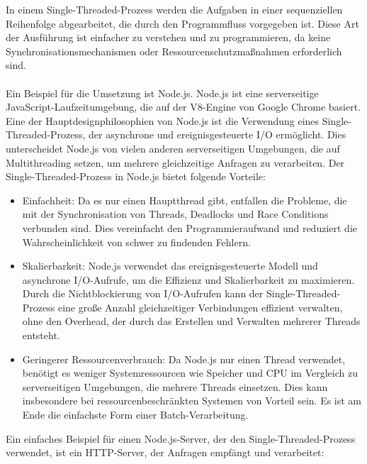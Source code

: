 \documentclass[../vs-script-first-v01.tex]{subfiles}
\begin{document}
In einem Single-Threaded-Prozess werden die Aufgaben in einer sequenziellen Reihenfolge abgearbeitet, die durch den Programmfluss vorgegeben ist. Diese Art der Ausführung ist einfacher zu verstehen und zu programmieren, da keine Synchronisationsmechanismen oder Ressourcenschutzmaßnahmen erforderlich sind.\\\\

Ein Beispiel für die Umsetzung ist Node.js. Node.js ist eine serverseitige JavaScript-Laufzeitumgebung, die auf der V8-Engine von Google Chrome basiert. Eine der Hauptdesignphilosophien von Node.js ist die Verwendung eines Single-Threaded-Prozess, der asynchrone und ereignisgesteuerte I/O ermöglicht. Dies unterscheidet Node.js von vielen anderen serverseitigen Umgebungen, die auf Multithreading setzen, um mehrere gleichzeitige Anfragen zu verarbeiten. Der Single-Threaded-Prozess in Node.js bietet folgende Vorteile:
\begin{itemize}
\item Einfachheit: Da es nur einen Hauptthread gibt, entfallen die Probleme, die mit der Synchronisation von Threads, Deadlocks und Race Conditions verbunden sind. Dies vereinfacht den Programmieraufwand und reduziert die Wahrscheinlichkeit von schwer zu findenden Fehlern.
\item Skalierbarkeit: Node.js verwendet das ereignisgesteuerte Modell und asynchrone I/O-Aufrufe, um die Effizienz und Skalierbarkeit zu maximieren. Durch die Nichtblockierung von I/O-Aufrufen kann der Single-Threaded-Prozess eine große Anzahl gleichzeitiger Verbindungen effizient verwalten, ohne den Overhead, der durch das Erstellen und Verwalten mehrerer Threads entsteht.
\item Geringerer Ressourcenverbrauch: Da Node.js nur einen Thread verwendet, benötigt es weniger Systemressourcen wie Speicher und CPU im Vergleich zu serverseitigen Umgebungen, die mehrere Threads einsetzen. Dies kann insbesondere bei ressourcenbeschränkten Systemen von Vorteil sein. Es ist am Ende die einfachste Form einer Batch-Verarbeitung.
\end{itemize}
Ein einfaches Beispiel für einen Node.js-Server, der den Single-Threaded-Prozess verwendet, ist ein HTTP-Server, der Anfragen empfängt und verarbeitet:
\end{document}
